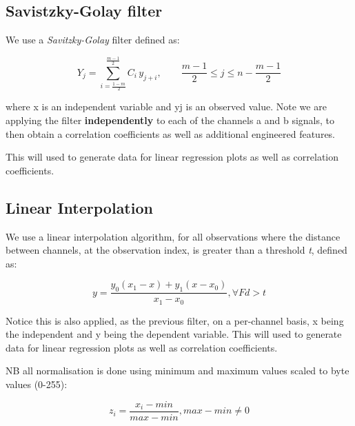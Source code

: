 \subsection{Savistzky-Golay filter}

We use a \textit{Savitzky-Golay} filter \cite{Savitzky:1964} defined as:

$$ Y_j= \sum _{i=\tfrac{1-m}2}^{\tfrac{m-1}2}C_i\, y_{j+i},\qquad  \frac{m-1}{2} \le j \le n-\frac{m-1}{2} $$

where x is an independent variable and yj is an observed value. Note we are applying the filter \textbf{independently} to each of the channels a and b signals, to then obtain a correlation coefficients as well as additional engineered features.

This will used to generate data for linear regression plots as well as correlation coefficients.

\subsection{Linear Interpolation}

We use a linear interpolation algorithm, for all observations where the distance between channels, at the observation index, is greater than a threshold \textit{t}, defined as:

$$ y = \frac{y_0(x_1-x)+y_1(x-x_0)}{x_1-x_0} , \forall Fd > t $$

Notice this is also applied, as the previous filter, on a per-channel basis, x being the independent and y being the dependent variable.
This will used to generate data for linear regression plots as well as correlation coefficients. 

NB all normalisation is done using minimum and maximum values scaled to byte values (0-255):

$$ z{_i}=\frac{x{_i}-min}{max-min} , max-min \neq 0 $$